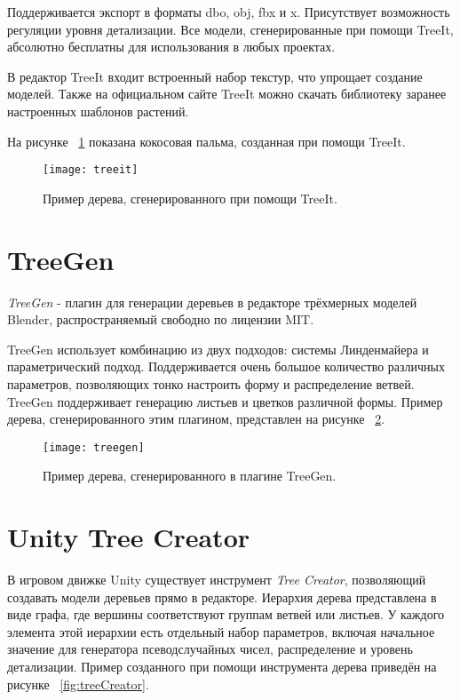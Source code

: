 Поддерживается экспорт в форматы dbo, obj, fbx и x. Присутствует возможность регуляции уровня детализации. Все модели, сгенерированные при помощи TreeIt, абсолютно бесплатны для использования в любых проектах.

В редактор TreeIt входит встроенный набор текстур, что упрощает создание моделей. Также на официальном сайте TreeIt\cite{treeit} можно скачать библиотеку заранее настроенных шаблонов растений. 

На рисунке ~\ref{fig:treeit} показана кокосовая пальма, созданная при помощи TreeIt. 

\begin{figure}[h]
    \centering
    \texttt{[image: treeit]}
    \caption{Пример дерева, сгенерированного при помощи TreeIt.}
    \label{fig:treeit}
\end{figure}

\newpage
\section{TreeGen}
\emph{TreeGen} - плагин для генерации деревьев в редакторе трёхмерных моделей Blender, распространяемый свободно по лицензии MIT.

TreeGen использует комбинацию из двух подходов: системы Линденмайера и параметрический подход. Поддерживается очень большое количество различных параметров, позволяющих тонко настроить форму и распределение ветвей. TreeGen поддерживает генерацию листьев и цветков различной формы. Пример дерева, сгенерированного этим плагином, представлен на рисунке ~\ref{fig:treegen}.

\begin{figure}[h]
    \centering
    \texttt{[image: treegen]}
    \caption{Пример дерева, сгенерированного в плагине TreeGen.}
    \label{fig:treegen}
\end{figure}

\section{Unity Tree Creator}
В игровом движке Unity существует инструмент \emph{Tree Creator}, позволяющий создавать модели деревьев прямо в редакторе. Иерархия дерева представлена в виде графа, где вершины соответствуют группам ветвей или листьев. У каждого элемента этой иерархии есть отдельный набор параметров, включая начальное значение для генератора псеводслучайных чисел, распределение и уровень детализации. Пример созданного при помощи инструмента дерева приведён на рисунке ~\ref{fig:treeCreator}.

